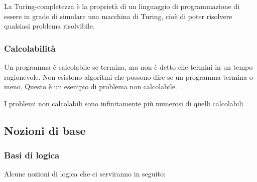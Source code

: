 \documentclass[a4paper]{article}
\begin{document}
\begin{define}
  La Turing-completezza è la proprietà di un linguaggio di programmazione di essere
  in grado di simulare una macchina di Turing, cioè di poter risolvere qualsiasi problema
  risolvibile.
\end{define}

\subsubsection{Calcolabilità}
Un programma è calcolabile se termina, ma non è detto che termini in un tempo ragionevole.
Non esistono algoritmi che possono dire se un programma termina o meno. Questo è un esempio
di problema non calcolabile.

I problemi non calcolabili sono infinitamente più numerosi di quelli calcolabili

\subsection{Nozioni di base}
\subsubsection{Basi di logica}

Alcune nozioni di logica che ci serviranno in seguito:
\end{document}
